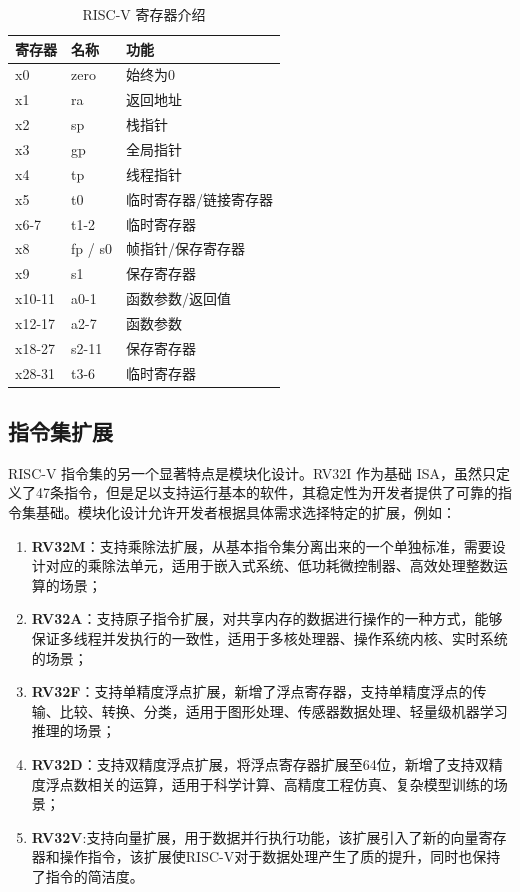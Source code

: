 \begin{table}[htbp]
	\centering
	\caption{RISC-V 寄存器介绍}
	\begin{tabularx}{\textwidth}{>{\centering\arraybackslash}X >{\centering\arraybackslash}X >{\centering\arraybackslash}X}
		\toprule
		\textbf{寄存器} & \textbf{名称} & \textbf{功能} \\
		\midrule
		x0           & zero        & 始终为0        \\
		x1           & ra          & 返回地址        \\
		x2           & sp          & 栈指针         \\
		x3           & gp          & 全局指针        \\
		x4           & tp          & 线程指针        \\
		x5           & t0          & 临时寄存器/链接寄存器 \\
		x6-7         & t1-2        & 临时寄存器       \\
		x8           & fp / s0     & 帧指针/保存寄存器   \\
		x9           & s1          & 保存寄存器       \\
		x10-11       & a0-1        & 函数参数/返回值    \\
		x12-17       & a2-7        & 函数参数        \\
		x18-27       & s2-11       & 保存寄存器       \\
		x28-31       & t3-6        & 临时寄存器       \\
		\bottomrule
	\end{tabularx}
	\label{tab:riscv_instruction_register}
\end{table}

\subsection{指令集扩展}

RISC-V 指令集的另一个显著特点是模块化设计。RV32I 作为基础 ISA，虽然只定义了47条指令，但是足以支持运行基本的软件，其稳定性为开发者提供了可靠的指令集基础。模块化设计允许开发者根据具体需求选择特定的扩展，例如：
\begin{enumerate}[]
	\item \textbf{RV32M}：支持乘除法扩展，从基本指令集分离出来的一个单独标准，需要设计对应的乘除法单元，适用于嵌入式系统、低功耗微控制器、高效处理整数运算的场景；
	\item \textbf{RV32A}：支持原子指令扩展，对共享内存的数据进行操作的一种方式，能够保证多线程并发执行的一致性，适用于多核处理器、操作系统内核、实时系统的场景；
	\item \textbf{RV32F}：支持单精度浮点扩展，新增了浮点寄存器，支持单精度浮点的传输、比较、转换、分类，适用于图形处理、传感器数据处理、轻量级机器学习推理的场景；
	\item \textbf{RV32D}：支持双精度浮点扩展，将浮点寄存器扩展至64位，新增了支持双精度浮点数相关的运算，适用于科学计算、高精度工程仿真、复杂模型训练的场景；
	\item \textbf{RV32V}:支持向量扩展，用于数据并行执行功能，该扩展引入了新的向量寄存器和操作指令，该扩展使RISC-V对于数据处理产生了质的提升，同时也保持了指令的简洁度。
\end{enumerate}


